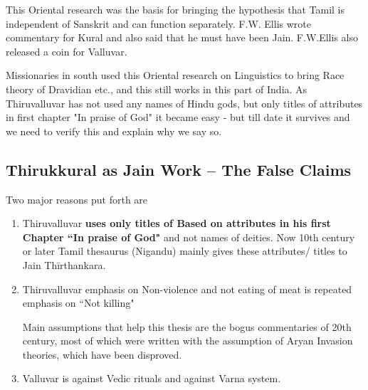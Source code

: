 This Oriental research was the basis for bringing the hypothesis that Tamil is independent of Sanskrit and can function separately. F.W. Ellis wrote commentary for Kural and also said that he must have been Jain. F.W.Ellis also released a coin for Valluvar.

Missionaries in south used this Oriental research on Linguistics to bring Race theory of Dravidian etc., and this still works in this part of India. As Thiruvalluvar has not used any names of Hindu gods, but only titles of attributes in first chapter "In praise of God" it became easy - but till date it survives and we need to verify this and explain why we say so.

\subsection*{Thirukkural as Jain Work – The False Claims}

Two major reasons put forth are

\begin{enumerate}[{\rm 1)}]
\itemsep=0pt
\item Thiruvalluvar \textbf{uses only titles of Based on attributes in his first Chapter “In praise of God"} and not names of deities. Now 10th century or later Tamil thesaurus (Nigandu) mainly gives these attributes/ titles to Jain Thīrthankara.

 \item 
 Thiruvalluvar emphasis on Non-violence and not eating of meat is repeated emphasis on “Not killing"

 Main assumptions that help this thesis are the bogus commentaries of 20th century, most of which were written with the assumption of Aryan Invasion theories, which have been disproved.

 \item Valluvar is against Vedic rituals and against Varna system.

\end{enumerate}


